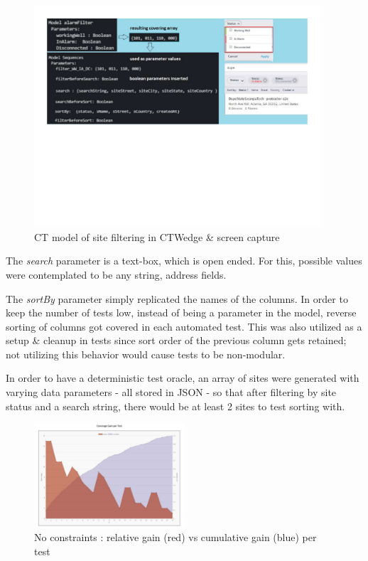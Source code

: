 \documentclass[conference]{IEEEtran}
\begin{document}
	\begin{figure}[!ht]
		\centering
			\includegraphics[width=0.95\textwidth,]{siteFilterModel.pdf}
			\caption{CT model of site filtering in CTWedge \& screen capture}
			\label{fig:siteFilterModel}
	\end{figure}

	The \textit{search} parameter is a text-box, which is open ended. For this, possible values were contemplated to be any string, address fields.

	The \textit{sortBy} parameter simply replicated the names of the columns. 
	In order to keep the number of tests low, instead of being a parameter in the model, reverse sorting of columns got covered in each automated test.
	This was also utilized as a setup \& cleanup in tests since sort order of the previous column gets retained; not utilizing this behavior  would cause tests to be non-modular.

	In order to have a deterministic test oracle, an array of sites were generated with varying data parameters - all stored in JSON - so that after filtering by site status and a search string, there would be at least 2 sites to test sorting with.
	
	\begin{figure}[!b]
		\includegraphics[width=0.50\textwidth,]{coverageGainPerTest.pdf}
		\caption{No constraints : relative gain (red) vs cumulative gain (blue) per test}
		\label{fig:coverageGainPerTest}
	\end{figure}
\end{document}

